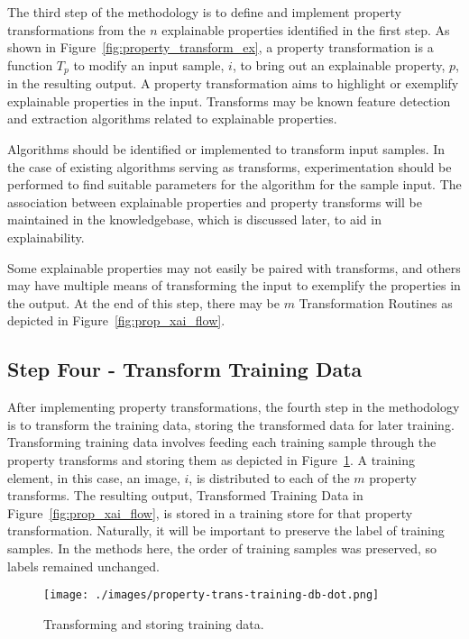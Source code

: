 The third step of the methodology is to define and implement property
transformations from the $n$ explainable properties identified in the first
step. As shown in Figure~\ref{fig:property_transform_ex}, a property
transformation is a function $T_p$ to modify an input sample, $i$, to bring out
an explainable property, $p$, in the resulting output. A property transformation
aims to highlight or exemplify explainable properties in the input. Transforms
may be known feature detection and extraction algorithms related to explainable
properties.

Algorithms should be identified or implemented to transform input samples. In
the case of existing algorithms serving as transforms, experimentation should be
performed to find suitable parameters for the algorithm for the sample input.
The association between explainable properties and property transforms will be
maintained in the knowledgebase, which is discussed later, to aid in
explainability. 

Some explainable properties may not easily be paired with transforms, and others
may have multiple means of transforming the input to exemplify the properties in
the output. At the end of this step, there may be $m$ Transformation Routines as
depicted in Figure~\ref{fig:prop_xai_flow}.

\subsection{Step Four - Transform Training Data} %

After implementing property transformations, the fourth step in the methodology
is to transform the training data, storing the transformed data for later
training. Transforming training data involves feeding each training sample
through the property transforms and storing them as depicted in
Figure~\ref{fig:property_trans_training}. A training element, in this case, an
image, $i$, is distributed to each of the $m$ property transforms. The resulting
output, Transformed Training Data in Figure~\ref{fig:prop_xai_flow}, is stored
in a training store for that property transformation. Naturally, it will be
important to preserve the label of training samples. In the methods here, the
order of training samples was preserved, so labels remained unchanged.

\begin{figure}[h]
    \texttt{[image: ./images/property-trans-training-db-dot.png]}
    \caption{Transforming and storing training data.}
    \label{fig:property_trans_training}
\end{figure}

